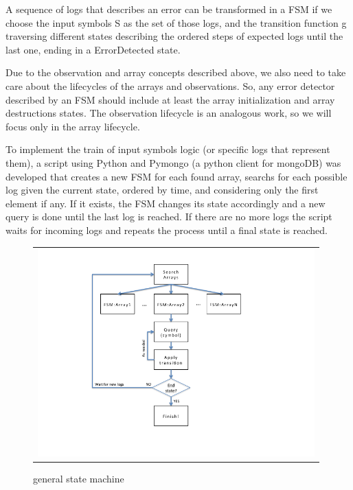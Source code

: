 \documentclass[]{spie}  %
\begin{document}
A sequence of logs that describes an error can be transformed in a FSM if we
choose the input symbols S as the set of those logs, and the transition
function g traversing different states describing the ordered steps of expected
logs until the last one, ending in a ErrorDetected state. 

Due to the observation and array concepts described above, we also need to take
care about the lifecycles of the arrays and observations. So, any error
detector described by an FSM should include at least the array initialization
and array destructions states. The observation lifecycle is an analogous work,
    so we will focus only in the array lifecycle.

To implement the train of input symbols logic (or specific logs that represent
        them), a script using Python and Pymongo (a python client for mongoDB)
    was developed that creates a new FSM for each found array, searchs for each
    possible log given the current state, ordered by time, and considering only
    the first element if any. If it exists, the FSM changes its state
    accordingly and a new query is done until the last log is reached. If there
    are no more logs the script waits for incoming logs and repeats the process
    until a final state is reached.

   \begin{figure}[!ht]
   \begin{center}
   \begin{tabular}{c}
   \includegraphics[height=8.0cm]{../img/FSM-flow-diagram.png}
   \end{tabular}
   \end{center}
   \caption[fsm] 
   { \label{fig:fsm} general state machine}
   \end{figure} 
\end{document}
